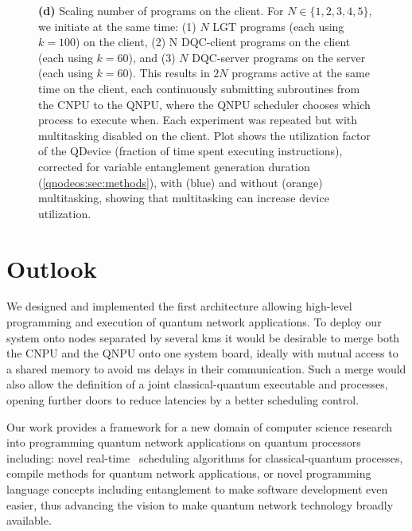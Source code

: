 \begin{figure}[htbp]
{\textbf{(d)} Scaling number of programs on the client. For $N \in \{1,2,3,4,5\}$, we initiate at the same time: (1) $N$ LGT programs (each using $k=100$) on the client, (2) N DQC-client programs on the client (each using $k=60$), and (3) $N$ DQC-server programs on the server (each using $k=60$). This results in $2N$ programs active at the same time on the client, each continuously submitting subroutines from the CNPU to the QNPU, where the QNPU scheduler chooses which process to execute when. Each experiment was repeated but with multitasking disabled on the client. Plot shows the utilization factor of the QDevice (fraction of time spent executing instructions), corrected for variable entanglement generation duration (\cref{qnodeos:sec:methods}), with (blue) and without (orange) multitasking, showing that multitasking can increase device utilization.}
\label{fig:fig4}
\end{figure}

\section{Outlook}
We designed and implemented the first architecture allowing high-level programming and execution of quantum network applications. To deploy our system onto nodes separated by several kms it would be desirable to merge both the CNPU and the QNPU onto one system board, ideally with mutual access to a shared memory to avoid ms delays in their communication. Such a merge would also allow the definition of a joint classical-quantum executable and processes, opening further doors to reduce latencies by a better scheduling control.

Our work provides a framework for a new domain of computer science research into programming quantum network applications on quantum processors including: novel real-time~\cite{ramamritham_scheduling_1994} scheduling algorithms for classical-quantum processes, compile methods for quantum network applications, or novel programming language concepts including entanglement to make software development even easier, thus advancing the vision to make quantum network technology broadly available.


